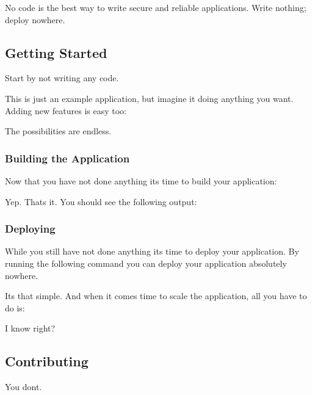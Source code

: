 No code is the best way to write secure and reliable applications. Write nothing; deploy nowhere.

\subsection*{Getting Started}

Start by not writing any code.


\begin{DoxyCode}
\end{DoxyCode}


This is just an example application, but imagine it doing anything you want. Adding new features is easy too\+:


\begin{DoxyCode}
\end{DoxyCode}


The possibilities are endless.

\subsubsection*{Building the Application}

Now that you have not done anything it\textquotesingle{}s time to build your application\+:


\begin{DoxyCode}
\end{DoxyCode}


Yep. That\textquotesingle{}s it. You should see the following output\+:


\begin{DoxyCode}
\end{DoxyCode}


\subsubsection*{Deploying}

While you still have not done anything it\textquotesingle{}s time to deploy your application. By running the following command you can deploy your application absolutely nowhere.


\begin{DoxyCode}
\end{DoxyCode}


It\textquotesingle{}s that simple. And when it comes time to scale the application, all you have to do is\+:


\begin{DoxyCode}
\end{DoxyCode}


I know right?

\subsection*{Contributing}

You don\textquotesingle{}t. 